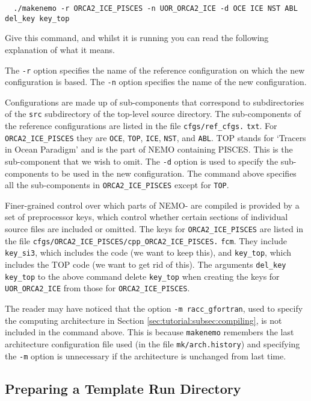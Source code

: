 \begin{verbatim}
  ./makenemo -r ORCA2_ICE_PISCES -n UOR_ORCA2_ICE -d OCE ICE NST ABL del_key key_top
\end{verbatim}

\noindent{}Give this command, and whilst it is running you can read the following explanation of what it means.

The \verb|-r| option specifies the name of the reference configuration on which the new configuration is based.
The \verb|-n| option specifies the name of the new configuration.

Configurations are made up of sub-components that correspond to subdirectories of the \verb|src| subdirectory of the top-level source directory.
The sub-components of the reference configurations are listed in the file \verb|cfgs/ref_cfgs.| \verb|txt|.
For \verb|ORCA2_ICE_PISCES| they are \verb|OCE|, \verb|TOP|, \verb|ICE|, \verb|NST|, and \verb|ABL|.
TOP stands for `Tracers in Ocean Paradigm' and is the part of NEMO containing PISCES.
This is the sub-component that we wish to omit.
The \verb|-d| option is used to specify the sub-components to be used in the new configuration.
The command above specifies all the sub-components in \verb|ORCA2_ICE_PISCES| except for \verb|TOP|.

Finer-grained control over which parts of NEMO-\SIcu{} are compiled is provided by a set of preprocessor keys, which control whether certain sections of individual source files are included or omitted.
The keys for \verb|ORCA2_ICE_|\linebreak\verb|PISCES| are listed in the file \verb|cfgs/ORCA2_ICE_PISCES/cpp_ORCA2_ICE_PISCES.| \verb|fcm|.
They include \verb|key_si3|, which includes the \SIcu{} code (we want to keep this), and \verb|key_top|, which includes the TOP code (we want to get rid of this).
The arguments \verb|del_key key_top| to the above command delete \verb|key_top| when creating the keys for \verb|UOR_ORCA2_ICE| from those for \verb|ORCA2_ICE_PISCES|.

The reader may have noticed that the option \verb|-m racc_gfortran|, used to specify the computing architecture in Section \ref{sec:tutorial:subsec:compiling}, is not included in the command above.
This is because \verb|makenemo| remembers the last architecture configuration file used (in the file \verb|mk/arch.history|) and specifying the \verb|-m| option is unnecessary if the architecture is unchanged from last time.


\subsection{Preparing a Template Run Directory}
\label{sec:tutorial:subsec:run-directory}

